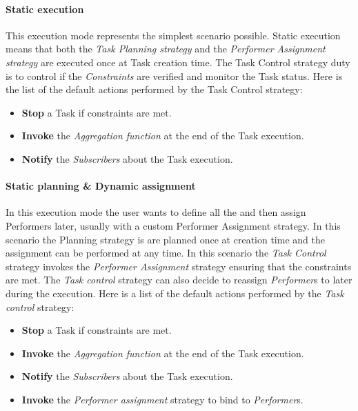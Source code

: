 \paragraph{Static execution}
\label{exec:static-static}
This execution mode represents the simplest scenario possible. Static execution
means that both the \emph{Task Planning strategy} and the \emph{Performer
Assignment strategy} are executed once at Task creation time. The Task Control
strategy duty is to control if the \emph{Constraints} are verified and monitor
the Task status. Here is the list of the default actions performed by the Task
Control strategy: 
\begin{itemize}
	\item \textbf{Stop} a Task if constraints are met.
	\item \textbf{Invoke} the \emph{Aggregation function} at the end of the Task
	execution.
	\item \textbf{Notify} the \emph{Subscribers} about the Task execution.
\end{itemize}




\paragraph{Static \utask{} planning \& Dynamic assignment}
\label{exec:static-dynamic}
In this execution mode the user wants to define all the \utask{} and then
assign Performers later, usually with a custom Performer Assignment strategy.
In this scenario the \utask{} Planning strategy is are planned once at creation
time and the assignment can be performed at any time. In this scenario the \emph{Task
Control} strategy invokes the \emph{Performer Assignment} strategy ensuring that
the constraints are met. The \emph{Task control} strategy can also decide to
reassign \emph{Performer}s to \utask{} later during the execution. Here is a
list of the default actions performed by the \emph{Task control} strategy:
\begin{itemize}
	\item \textbf{Stop} a Task if constraints are met.
	\item \textbf{Invoke} the \emph{Aggregation function} at the end of the Task
	execution.
	\item \textbf{Notify} the \emph{Subscribers} about the Task execution.
	\item \textbf{Invoke} the \emph{Performer assignment} strategy to bind \utask{}
	to \emph{Performer}s.
\end{itemize}





